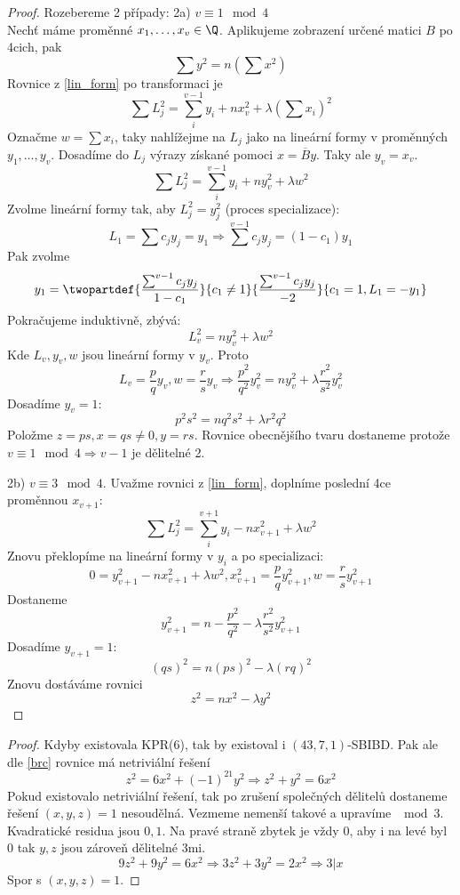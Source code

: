 \begin{proof}
	Rozebereme 2 případy:
	2a) $v \equiv 1 \mod 4$\\
	Nechť máme proměnné $x_1, \ldots, x_v \in \Q$.
	Aplikujeme zobrazení určené matici $B$ po 4cich, pak
	\[ \sum y^2 = n (\sum x^2) \]
	Rovnice z \cref{lin_form} po transformaci je
	\[ \sum L_j^2 = \sum_i^{v - 1} y_i + n x_v^2 + \lambda(\sum x_i)^2 \]
	Označme $w = \sum x_i$, taky nahlížejme na $L_j$ jako na lineární formy v proměnných $y_1, \ldots, y_v$.
	Dosadíme do $L_j$ výrazy získané pomoci $x = \overline{B}y$.
	Taky ale $y_v = x_v$.
	\[ \sum L_j^2 = \sum_i^{v - 1} y_i + n y_v^2 + \lambda w^2 \]
	Zvolme lineární formy tak, aby $L_j^2 = y_j^2$ (proces specializace):
	\[ L_1 = \sum c_j y_j = y_1 \Rightarrow \sum^{v - 1} c_j y_j = (1 - c_1) y_1 \]
	Pak zvolme
	\[ y_1 = \twopartdef{\frac{\sum^{v - 1} c_j y_j}{1 - c_1}}{c_1 \ne 1}{\frac{\sum^{v - 1} c_j y_j}{-2}}{c_1 = 1, L_1 = -y_1} \]
	Pokračujeme induktivně, zbývá:
	\[ L_v^2 = ny_v^2 + \lambda w^2 \]
	Kde $L_v, y_v, w$ jsou lineární formy v $y_v$.
	Proto
	\[ L_v = \frac{p}{q} y_v, w = \frac{r}{s} y_v \Rightarrow \frac{p^2}{q^2}y_v^2 = n y_v^2 + \lambda \frac{r^2}{s^2} y_v^2 \]
	Dosadíme $y_v = 1$:
	\[ p^2 s^2 = n q^2 s^2 + \lambda r^2 q^2 \]
	Položme $z = ps, x = qs \ne 0, y = rs$.
	Rovnice obecnějšího tvaru dostaneme protože $v \equiv 1 \mod 4 \Rightarrow v - 1$ je dělitelné 2.

	2b) $v \equiv 3 \mod4$.
	Uvažme rovnici z \cref{lin_form}, doplníme poslední 4ce proměnnou $x_{v + 1}$:
	\[ \sum L_j^2 = \sum_i^{v + 1} y_i - n x_{v + 1}^2 + \lambda w^2 \]
	Znovu překlopíme na lineární formy v $y_i$ a po specializaci:
	\[ 0 = y_{v + 1}^2 - n x_{v + 1}^2 + \lambda w^2, x_{v + 1}^2 = \frac{p}{q} y_{v + 1}^2, w = \frac{r}{s}y_{v + 1}^2 \]
	Dostaneme
	\[ y_{v + 1}^2 = n - \frac{p^2}{q^2} - \lambda \frac{r^2}{s^2}y_{v + 1}^2 \]
	Dosadíme $y_{v + 1} = 1$:
	\[ (qs)^2 = n (ps)^2 - \lambda(rq)^2 \]
	Znovu dostáváme rovnici
	\[ z^2 = nx^2 - \lambda y^2 \]

\end{proof}

\begin{consequence}
\end{consequence}
\begin{proof}
	Kdyby existovala KPR(6), tak by existoval i $(43, 7, 1)$-SBIBD.
	Pak ale dle \cref{brc} rovnice má netriviální řešení
	\[ z^2 = 6 x^2 + (-1)^{21} y^2 \Rightarrow z^2 + y^2 = 6 x^2 \]
	Pokud existovalo netriviální řešení, tak po zrušení společných dělitelů dostaneme řešení $(x, y, z) = 1$ nesoudělná.
	Vezmeme nemenší takové a upravíme $\mod 3$.
	Kvadratické residua jsou $0, 1$.
	Na pravé straně zbytek je vždy $0$, aby i na levé byl $0$ tak $y, z$ jsou zároveň dělitelné 3mi.
	\[ 9z^2 + 9y^2 = 6x^2 \Rightarrow 3z^2 + 3y^2 = 2x^2 \Rightarrow 3 | x \]
	Spor s $(x, y, z) = 1$.
\end{proof}

